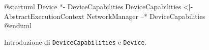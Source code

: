 \begin{figure}
  \centering
    \begin{plantuml}
      @startuml
      Device *- DeviceCapabilities
      DeviceCapabilities <|- AbstractExecutionContext
      NetworkManager --* DeviceCapabilities
      @enduml
    \end{plantuml}
    \caption{Introduzione di \texttt{DeviceCapabilities} e \texttt{Device}.}
  \label{fig:uml-device}
\end{figure}
%
